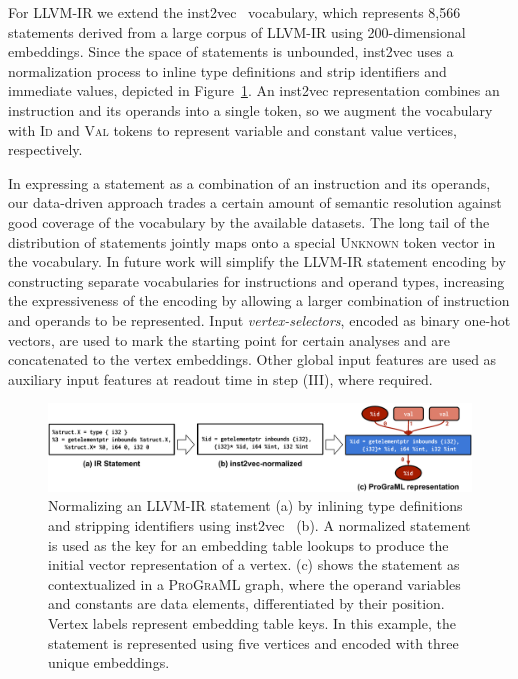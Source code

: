 For LLVM-IR we extend the inst2vec~\cite{Ben-nun2018} vocabulary,
which represents 8,566 statements derived from a large corpus of
LLVM-IR using 200-dimensional embeddings. Since the space of
statements is unbounded, inst2vec uses a normalization process to
inline type definitions and strip identifiers and immediate values,
depicted in Figure~\ref{fig:embedding}. An inst2vec representation
combines an instruction and its operands into a single token, so we
augment the vocabulary with \textsc{Id} and \textsc{Val} tokens to
represent variable and constant value vertices, respectively.

In expressing a statement as a combination of an instruction and its
operands, our data-driven approach trades a certain amount of semantic
resolution against good coverage of the vocabulary by the available
datasets. The long tail of the distribution of statements jointly maps
onto a special \textsc{Unknown} token vector in the vocabulary. In
future work will simplify the LLVM-IR statement encoding by
constructing separate vocabularies for instructions and operand types,
increasing the expressiveness of the encoding by allowing a larger
combination of instruction and operands to be represented.  Input
\emph{vertex-selectors}, encoded as binary one-hot vectors, are used
to mark the starting point for certain analyses and are concatenated
to the vertex
embeddings.
Other global input features are used as auxiliary input features at
readout time in step (III), where required.

\begin{figure}
  \centering
  \includegraphics[width=\linewidth]{images/embedding}%
  \caption{%
    Normalizing an LLVM-IR statement (a) by inlining type definitions
    and stripping identifiers using inst2vec~\cite{Ben-nun2018} (b). A
    normalized statement is used as the key for an embedding table
    lookups to produce the initial vector representation of a
    vertex. (c) shows the statement as contextualized in a
    \textsc{ProGraML} graph, where the operand variables and constants
    are data elements, differentiated by their position. Vertex labels
    represent embedding table keys. In this example, the statement is
    represented using five vertices and encoded with three unique
    embeddings.%
  }%
  \label{fig:embedding}%
\end{figure}


